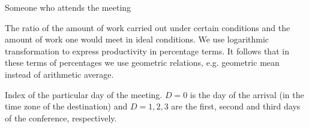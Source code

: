  Someone who attends the meeting

 The ratio of the amount of work carried out under certain conditions and the amount of work one would meet in ideal conditions. We use logarithmic transformation to express productivity in percentage terms. It follows that in these terms of percentages we use geometric relations, e.g. geometric mean instead of arithmetic average.

 Index of the particular day of the meeting. $D = 0$ is the day of the arrival (in the time zone of the destination) and $D = 1, 2, 3$ are the first, second and third days of the conference, respectively.